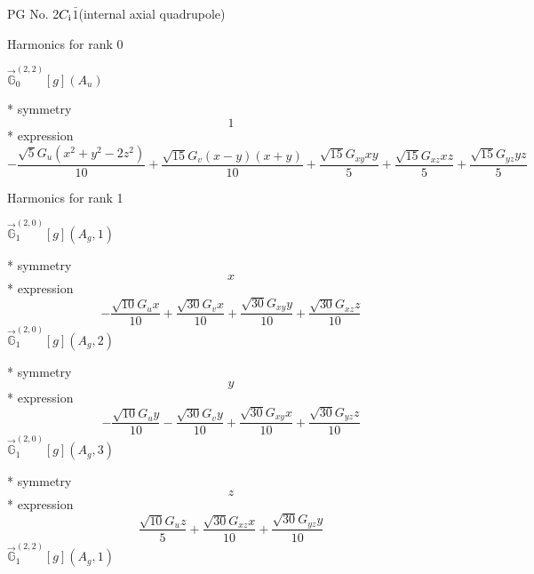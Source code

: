\documentclass[fleqn,8pt]{jsarticle}
\begin{document}
\setcounter{MaxMatrixCols}{32}

\renewcommand{\tablename}{Table~}
\renewcommand{\figurename}{Figure~}
\begin{center}
\LARGE
PG No. 2\quad$C_{\rm i}$\quad$\bar{1}$\quad[ triclinic ] (internal axial quadrupole)
\end{center}

\noindent * Harmonics for rank 0

\noindent\quad $\vec{\mathbb{G}}_{0}^{(2,2)}[g](A_{u})$

\noindent\quad ** symmetry
\begin{dmath*}
1
\end{dmath*}
\noindent\quad ** expression
\begin{dmath*}
- \frac{\sqrt{5} G_{u} \left(x^{2} + y^{2} - 2 z^{2}\right)}{10} + \frac{\sqrt{15} G_{v} \left(x - y\right) \left(x + y\right)}{10} + \frac{\sqrt{15} G_{xy} x y}{5} + \frac{\sqrt{15} G_{xz} x z}{5} + \frac{\sqrt{15} G_{yz} y z}{5}
\end{dmath*}

\noindent * Harmonics for rank 1

\noindent\quad $\vec{\mathbb{G}}_{1}^{(2,0)}[g](A_{g},1)$

\noindent\quad ** symmetry
\begin{dmath*}
x
\end{dmath*}
\noindent\quad ** expression
\begin{dmath*}
- \frac{\sqrt{10} G_{u} x}{10} + \frac{\sqrt{30} G_{v} x}{10} + \frac{\sqrt{30} G_{xy} y}{10} + \frac{\sqrt{30} G_{xz} z}{10}
\end{dmath*}
\noindent\quad $\vec{\mathbb{G}}_{1}^{(2,0)}[g](A_{g},2)$

\noindent\quad ** symmetry
\begin{dmath*}
y
\end{dmath*}
\noindent\quad ** expression
\begin{dmath*}
- \frac{\sqrt{10} G_{u} y}{10} - \frac{\sqrt{30} G_{v} y}{10} + \frac{\sqrt{30} G_{xy} x}{10} + \frac{\sqrt{30} G_{yz} z}{10}
\end{dmath*}
\noindent\quad $\vec{\mathbb{G}}_{1}^{(2,0)}[g](A_{g},3)$

\noindent\quad ** symmetry
\begin{dmath*}
z
\end{dmath*}
\noindent\quad ** expression
\begin{dmath*}
\frac{\sqrt{10} G_{u} z}{5} + \frac{\sqrt{30} G_{xz} x}{10} + \frac{\sqrt{30} G_{yz} y}{10}
\end{dmath*}
\noindent\quad $\vec{\mathbb{G}}_{1}^{(2,2)}[g](A_{g},1)$
\end{document}

